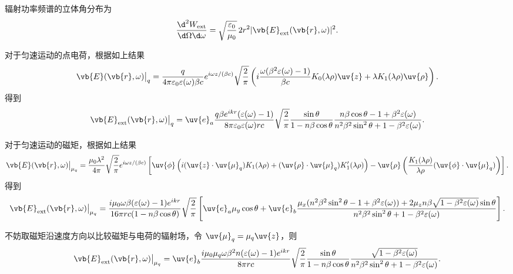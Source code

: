 辐射功率频谱的立体角分布为
\begin{equation*}
	\frac{\d^{2} W_{\mathrm{ext}}}{\d \Omega \d \omega} = \sqrt{\frac{\varepsilon_{0}}{\mu_{0}}} \, 2 r^{2} | \vb{E}_{\mathrm{ext}}(\vb{r}, \omega) |^{2}.
\end{equation*}

对于匀速运动的点电荷，根据如上结果
\begin{equation*}
	\vb{E}(\vb{r}, \omega)\big|_{q} = \frac{q}{4\pi \varepsilon_{0} \varepsilon(\omega) \beta c} e^{i\omega z/(\beta c)} \sqrt{\frac{2}{\pi}} \left( i \frac{\omega (\beta^{2} \varepsilon(\omega) - 1)}{\beta c} K_{0}(\lambda \rho) \uv{z} + \lambda K_{1}(\lambda \rho) \uv{\rho} \right).
\end{equation*}
得到
\begin{equation*}
	\vb{E}_{\mathrm{ext}}(\vb{r}, \omega)\big|_{q} = \uv{e}_{a} \frac{q \beta e^{i k r} (\varepsilon(\omega) - 1)}{8\pi \varepsilon_{0} \varepsilon(\omega) r c} \sqrt{\frac{2}{\pi}} \frac{\sin\theta}{1 - n \beta \cos\theta} \frac{n \beta \cos\theta - 1 + \beta^{2} \varepsilon(\omega)}{n^{2} \beta^{2} \sin^{2}\theta + 1 - \beta^{2} \varepsilon(\omega)}.
\end{equation*}

对于匀速运动的磁矩，根据如上结果
\begin{equation*}
	\vb{E}(\vb{r}, \omega)\big|_{\mu_{q}} = \frac{\mu_{0} \lambda^{2}}{4\pi} \sqrt{\frac{2}{\pi}} e^{i\omega z/(\beta c)} \left[ \uv{\phi} \left( i (\uv{z} \cdot \uv{\mu}_{q}) K_{1}(\lambda \rho) + (\uv{\rho} \cdot \uv{\mu}_{q}) K_{1}'(\lambda \rho) \right) - \uv{\rho} \left( \frac{K_{1}(\lambda \rho)}{\lambda \rho} (\uv{\phi} \cdot \uv{\mu}_{q}) \right) \right].
\end{equation*}
得到
\begin{equation*}
	\vb{E}_{\mathrm{ext}}(\vb{r}, \omega)\big|_{\mu_{q}} = \frac{i \mu_{0} \omega \beta (\varepsilon(\omega) - 1) e^{i k r}}{16\pi r c (1 - n \beta \cos\theta)} \sqrt{\frac{2}{\pi}} \left[ \uv{e}_{a} \mu_{y} \cos\theta + \uv{e}_{b} \frac{\mu_{x} (n^{2} \beta^{2} \sin^{2}\theta - 1 + \beta^{2} \varepsilon(\omega)) + 2 \mu_{z} n \beta \sqrt{1 - \beta^{2} \varepsilon(\omega)} \sin\theta}{n^{2} \beta^{2} \sin^{2}\theta + 1 - \beta^{2} \varepsilon(\omega)} \right].
\end{equation*}

不妨取磁矩沿速度方向以比较磁矩与电荷的辐射场，令 \(\uv{\mu}_{q} = \mu_{q} \uv{z}\)，则
\begin{equation*}
	\vb{E}_{\mathrm{ext}}(\vb{r}, \omega)\big|_{\mu_{q}} = \uv{e}_{b} \frac{i \mu_{0} \mu_{q} \omega \beta^{2} n (\varepsilon(\omega) - 1) e^{i k r}}{8\pi r c} \sqrt{\frac{2}{\pi}} \frac{\sin\theta}{1 - n \beta \cos\theta} \frac{\sqrt{1 - \beta^{2} \varepsilon(\omega)}}{n^{2} \beta^{2} \sin^{2}\theta + 1 - \beta^{2} \varepsilon(\omega)}.
\end{equation*}

